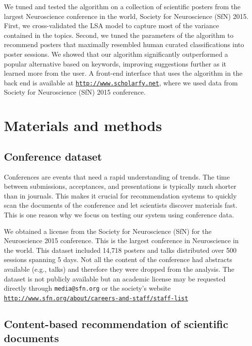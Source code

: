 \documentclass[a4paper]{article}
\begin{document}
We tuned and tested the algorithm on a collection of scientific posters from the largest Neuroscience conference in the world, Society for Neuroscience (SfN) 2015. First, we cross-validated the LSA model to capture most of the variance contained in the topics. Second, we tuned the parameters of the algorithm to recommend posters that maximally resembled human curated classifications into poster sessions. We showed that our algorithm significantly outperformed a popular alternative based on keywords, improving suggestions further as it learned more from the user. A front-end interface that uses the algorithm in the back end is available at \href{http://www.scholarfy.net}{\texttt{http://www.scholarfy.net}}, where we used data from Society for Neuroscience (SfN) 2015 conference.

\section{Materials and methods} \label{methods}

\subsection{Conference dataset}

Conferences are events that need a rapid understanding of trends. The time between submissions, acceptances, and presentations is typically much shorter than in journals. This makes it crucial for recommendation systems to quickly scan the documents of the conference and let scientists discover materials fast. This is one reason why we focus on testing our system using conference data.


We obtained a license from the Society for Neuroscience (SfN) for the Neuroscience 2015 conference. This is the largest conference in Neuroscience in the world. This dataset included 14,718 posters and talks distributed over 500 sessions spanning 5 days. Not all the content of the conference had abstracts available (e.g., talks) and therefore they were dropped from the analysis. The dataset is not publicly available but an academic license may be requested directly through \texttt{media@sfn.org} or the society's website \href{http://www.sfn.org/about/careers-and-staff/staff-list}{\texttt{http://www.sfn.org/about/careers-and-staff/staff-list}}


\subsection{Content-based recommendation of scientific documents}
\end{document}
